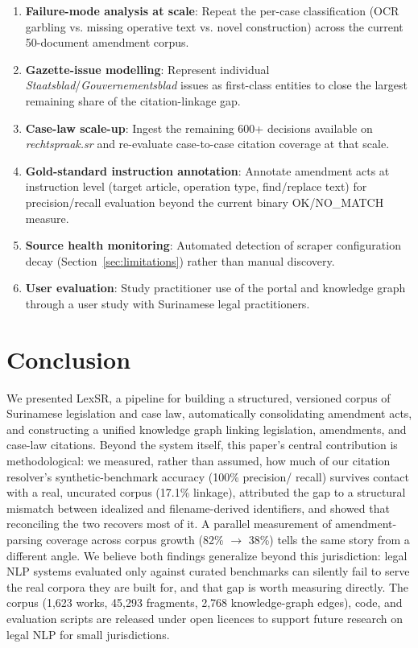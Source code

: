 \documentclass{IOS-Book-Article}
\begin{document}
\begin{enumerate}
\item \textbf{Failure-mode analysis at scale}: Repeat the per-case classification
   (OCR garbling vs. missing operative text vs. novel construction) across the current
   50-document amendment corpus.
\item \textbf{Gazette-issue modelling}: Represent individual \emph{Staatsblad}/\emph{Gouvernementsblad} issues
   as first-class entities to close the largest remaining share of the citation-linkage gap.
\item \textbf{Case-law scale-up}: Ingest the remaining 600+ decisions available on \emph{rechtspraak.sr}
   and re-evaluate case-to-case citation coverage at that scale.
\item \textbf{Gold-standard instruction annotation}: Annotate amendment acts at instruction level
   (target article, operation type, find/replace text) for precision/recall evaluation
   beyond the current binary OK/NO\_MATCH measure.
\item \textbf{Source health monitoring}: Automated detection of scraper configuration decay
   (Section~\ref{sec:limitations}) rather than manual discovery.
\item \textbf{User evaluation}: Study practitioner use of the portal and knowledge graph through a
   user study with Surinamese legal practitioners.
\end{enumerate}

\section{Conclusion}
\label{sec:conclusion}

We presented LexSR, a pipeline for building a structured, versioned corpus of Surinamese
legislation and case law, automatically consolidating amendment acts, and constructing a
unified knowledge graph linking legislation, amendments, and case-law citations. Beyond the
system itself, this paper's central contribution is methodological: we measured, rather than
assumed, how much of our citation resolver's synthetic-benchmark accuracy (100\% precision/
recall) survives contact with a real, uncurated corpus (17.1\% linkage), attributed the gap
to a structural mismatch between idealized and filename-derived identifiers, and showed that
reconciling the two recovers most of it.
A parallel measurement of amendment-parsing coverage across corpus growth (82\% $\rightarrow$ 38\%) tells
the same story from a different angle. We believe both findings generalize beyond this
jurisdiction: legal NLP systems evaluated only against curated benchmarks can silently fail
to serve the real corpora they are built for, and that gap is worth measuring directly. The
corpus (1,623 works, 45,293 fragments, 2,768 knowledge-graph edges), code, and evaluation
scripts are released under open licences to support future research on legal NLP for small
jurisdictions.
\end{document}
